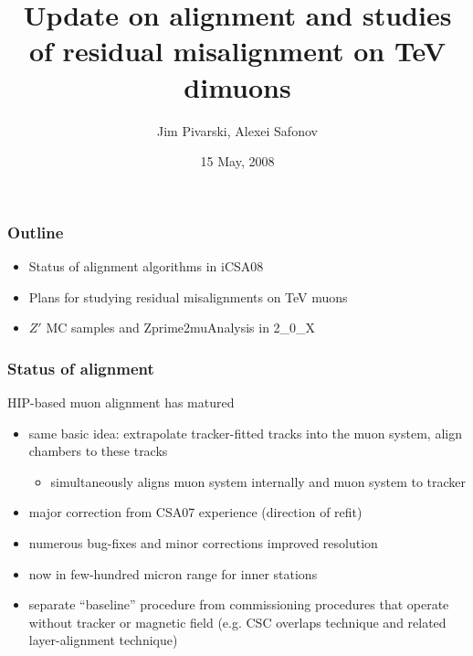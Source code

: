 \documentclass[compress]{beamer}
\title{Update on alignment and studies of residual misalignment on TeV dimuons}
\author{Jim Pivarski, Alexei Safonov}
\institute{Texas A\&M University}
\date{15 May, 2008}
\begin{document}
\frame{\titlepage}


\begin{frame}
\frametitle{Outline}
\begin{itemize}\setlength{\itemsep}{0.75 cm}
\item Status of alignment algorithms in iCSA08
\item Plans for studying residual misalignments on TeV muons
\item $Z'$ MC samples and Zprime2muAnalysis in 2\_0\_X
\end{itemize}
\end{frame}

\begin{frame}
\frametitle{Status of alignment}

HIP-based muon alignment has matured

\vspace{0.25 cm}
\begin{itemize}\setlength{\itemsep}{0.25 cm}
\item same basic idea: extrapolate tracker-fitted tracks into the muon
system, align chambers to these tracks
\begin{itemize}
\item simultaneously aligns muon system internally and muon system to tracker
\end{itemize}
\item major correction from CSA07 experience (direction of refit)
\item numerous bug-fixes and minor corrections improved resolution
\item now in few-hundred micron range for inner stations
\item separate ``baseline'' procedure from commissioning procedures
that operate without tracker or magnetic field (e.g. CSC overlaps
technique and related layer-alignment technique)
\end{itemize}

\end{frame}
\end{document}
